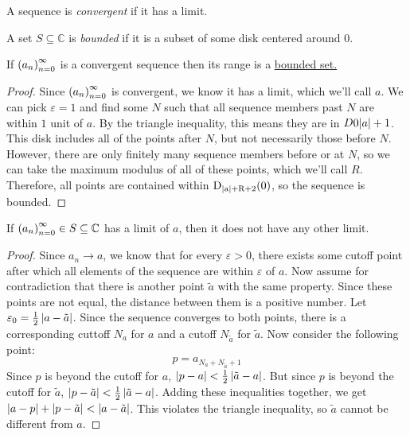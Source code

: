 \documentclass{refbook}
\begin{document}
\begin{definition}
A sequence is \emph{convergent} if it has a limit.
\end{definition}
\begin{definition}
A set $S \subseteq \mathbb{C}$ is \emph{bounded} if it is a subset of some disk centered around $0$.
\end{definition}
\begin{lemma}
If $\seq{a}$ is a convergent sequence then its range is a \hyperlink{Bounded Set}{bounded set.}
\end{lemma}
\begin{proof}
Since $\seq{a}$ is convergent, we know it has a limit, which we'll call $a$. We can pick $\varepsilon = 1$ and find some $N$ such that all sequence members past $N$ are within $1$ unit of $a$. By the triangle inequality, this means they are in $D{0}{\modulus{a}+1}$. This disk includes all of the points after $N$, but not necessarily those before $N$. However, there are only finitely many sequence members before or at $N$, so we can take the maximum modulus of all of these points, which we'll call $R$. Therefore, all points are contained within $\disk{0}{\modulus{a}+R+2}$, so the sequence is bounded.
\end{proof}
\begin{theorem}
If $\seq{a} \in S \subseteq \mathbb{C}$ has a limit of $a$, then it does not have any other limit.
\end{theorem}
\begin{proof}
Since $a_n \to a$, we know that for every $\varepsilon > 0$, there exists some cutoff point after which all elements of the sequence are within $\varepsilon$ of $a$. Now assume for contradiction that there is another point $\tilde{a}$ with the same property. Since these points are not equal, the distance between them is a positive number. Let $\varepsilon_0 = \frac{1}{2}\modulus{a-\tilde{a}}$. Since the sequence converges to both points, there is a corresponding cuttoff $N_{a}$ for $a$ and a cutoff $N_{\tilde{a}}$ for $\tilde{a}$. Now consider the following point:
\begin{equation*} p = a_{N_{a}+N_{\tilde{a}}+1} \end{equation*}
Since $p$ is beyond the cutoff for $a$, $\modulus{p-a}<\frac{1}{2}\modulus{\tilde{a}-a}$. But since $p$ is beyond the cutoff for $\tilde{a}$, $\modulus{p-\tilde{a}} < \frac{1}{2}\modulus{\tilde{a}-a}$. Adding these inequalities together, we get $\modulus{a-p}+\modulus{p-\tilde{a}} < \modulus{a-\tilde{a}}$. This violates the triangle inequality, so $\tilde{a}$ cannot be different from $a$.
\end{proof}
\end{document}
